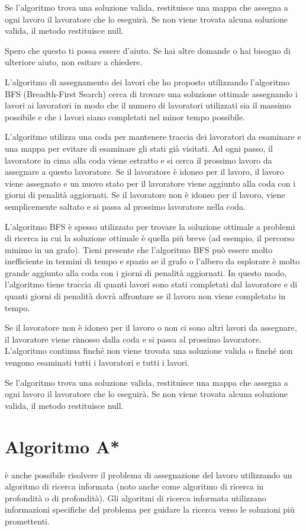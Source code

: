 Se l'algoritmo trova una soluzione valida, restituisce una mappa che assegna a ogni lavoro il lavoratore che lo eseguirà. Se non viene trovata alcuna soluzione valida, il metodo restituisce null.

Spero che questo ti possa essere d'aiuto. Se hai altre domande o hai bisogno di ulteriore aiuto, non esitare a chiedere.

L'algoritmo di assegnamento dei lavori che ho proposto utilizzando l'algoritmo BFS (Breadth-First Search) cerca di trovare una soluzione ottimale assegnando i lavori ai lavoratori in modo che il numero di lavoratori utilizzati sia il massimo possibile e che i lavori siano completati nel minor tempo possibile.

L'algoritmo utilizza una coda per mantenere traccia dei lavoratori da esaminare e una mappa per evitare di esaminare gli stati già visitati. Ad ogni passo, il lavoratore in cima alla coda viene estratto e si cerca il prossimo lavoro da assegnare a questo lavoratore. Se il lavoratore è idoneo per il lavoro, il lavoro viene assegnato e un nuovo stato per il lavoratore viene aggiunto alla coda con i giorni di penalità aggiornati. Se il lavoratore non è idoneo per il lavoro, viene semplicemente saltato e si passa al prossimo lavoratore nella coda.

L'algoritmo BFS è spesso utilizzato per trovare la soluzione ottimale a problemi di ricerca in cui la soluzione ottimale è quella più breve (ad esempio, il percorso minimo in un grafo). Tieni presente che l'algoritmo BFS può essere molto inefficiente in termini di tempo e spazio se il grafo o l'albero da esplorare è molto grande
aggiunto alla coda con i giorni di penalità aggiornati. In questo modo, l'algoritmo tiene traccia di quanti lavori sono stati completati dal lavoratore e di quanti giorni di penalità dovrà affrontare se il lavoro non viene completato in tempo.

Se il lavoratore non è idoneo per il lavoro o non ci sono altri lavori da assegnare, il lavoratore viene rimosso dalla coda e si passa al prossimo lavoratore. L'algoritmo continua finché non viene trovata una soluzione valida o finché non vengono esaminati tutti i lavoratori e tutti i lavori.

Se l'algoritmo trova una soluzione valida, restituisce una mappa che assegna a ogni lavoro il lavoratore che lo eseguirà. Se non viene trovata alcuna soluzione valida, il metodo restituisce null.

\section{Algoritmo A*}
è anche possibile risolvere il problema di assegnazione del lavoro utilizzando un algoritmo di ricerca informata (noto anche come algoritmo di ricerca in profondità o di profondità). Gli algoritmi di ricerca informata utilizzano informazioni specifiche del problema per guidare la ricerca verso le soluzioni più promettenti.

